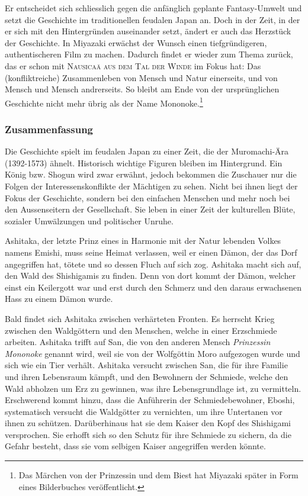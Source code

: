 Er entscheidet sich schliesslich gegen die anfänglich geplante Fantasy-Umwelt und setzt die Geschichte im traditionellen feudalen Japan an. Doch in der Zeit, in der er sich mit den Hintergründen auseinander setzt, ändert er auch das Herzstück der Geschichte. In Miyazaki erwächst der Wunsch einen tiefgründigeren, authentischeren Film zu machen. Dadurch findet er wieder zum Thema zurück, das er schon mit \textsc{Nausicaä aus dem Tal der Winde} im Fokus hat: Das (konfliktreiche) Zusammenleben von Mensch und Natur einerseits, und von Mensch und Mensch andrerseits. So bleibt am Ende von der ursprünglichen Geschichte nicht mehr übrig als der Name Mononoke.\footnote{Das Märchen von der Prinzessin und dem Biest hat Miyazaki später in Form eines Bilderbuches veröffentlicht.}

\subsubsection{Zusammenfassung}
Die Geschichte spielt im feudalen Japan zu einer Zeit, die der Muromachi-Ära (1392-1573) ähnelt. Historisch wichtige Figuren bleiben im Hintergrund. Ein König bzw. Shogun wird zwar erwähnt, jedoch bekommen die Zuschauer nur die Folgen der Interessenskonflikte der Mächtigen zu sehen. Nicht bei ihnen liegt der Fokus der Geschichte, sondern bei den einfachen Menschen und mehr noch bei den Aussenseitern der Gesellschaft. Sie leben in einer Zeit der kulturellen Blüte, sozialer Umwälzungen und politischer Unruhe. 

Ashitaka, der letzte Prinz eines in Harmonie mit der Natur lebenden Volkes namens Emishi, muss seine Heimat verlassen, weil er einen Dämon, der das Dorf angegriffen hat, tötete und so dessen Fluch auf sich zog. Ashitaka macht sich auf, den Wald des Shishigamis zu finden. Denn von dort kommt der Dämon, welcher einst ein Keilergott war und erst durch den Schmerz und den daraus erwachsenen Hass zu einem Dämon wurde. 

Bald findet sich Ashitaka zwischen verhärteten Fronten. Es herrscht Krieg zwischen den Waldgöttern und den Menschen, welche in einer Erzschmiede arbeiten. Ashitaka trifft auf San, die von den anderen Mensch \emph{Prinzessin Mononoke} genannt wird, weil sie von der Wolfgöttin Moro aufgezogen wurde und sich wie ein Tier verhält. Ashitaka versucht zwischen San, die für ihre Familie und ihren Lebensraum kämpft, und den Bewohnern der Schmiede, welche den Wald abholzen um Erz zu gewinnen, was ihre Lebensgrundlage ist, zu vermitteln. Erschwerend kommt hinzu, dass die Anführerin der Schmiedebewohner, Eboshi, systematisch versucht die Waldgötter zu vernichten, um ihre Untertanen vor ihnen zu schützen. Darüberhinaus hat sie dem Kaiser den Kopf des Shishigami versprochen. Sie erhofft sich so den Schutz für ihre Schmiede zu sichern, da die Gefahr besteht, dass sie vom selbigen Kaiser angegriffen werden könnte. 

